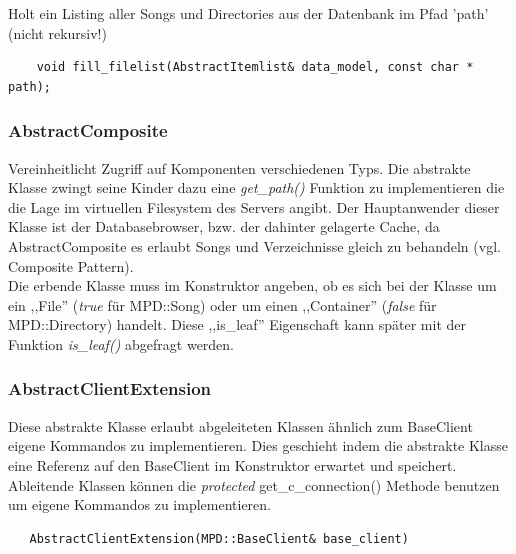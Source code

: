 Holt ein Listing aller Songs und Directories aus der Datenbank im Pfad 'path' (nicht rekursiv!)              
\begin{verbatim}
    void fill_filelist(AbstractItemlist& data_model, const char * path);
\end{verbatim}



\subsubsection{AbstractComposite}
Vereinheitlicht Zugriff auf Komponenten verschiedenen Typs.
Die abstrakte Klasse zwingt seine Kinder dazu eine \emph{get\_path()} Funktion zu implementieren die die Lage im virtuellen Filesystem des Servers angibt.
Der Hauptanwender dieser Klasse ist der Databasebrowser, bzw. der dahinter gelagerte Cache, da AbstractComposite es erlaubt Songs und Verzeichnisse gleich zu behandeln (vgl. Composite Pattern).
\\
Die erbende Klasse muss im Konstruktor angeben, ob es sich bei der Klasse um ein ,,File'' (\emph{true} für MPD::Song) oder um einen ,,Container'' (\emph{false} für MPD::Directory) handelt.
Diese ,,is\_leaf'' Eigenschaft kann später mit der Funktion \emph{is\_leaf()} abgefragt werden.



\subsubsection{AbstractClientExtension}


Diese abstrakte Klasse erlaubt abgeleiteten Klassen ähnlich zum BaseClient eigene Kommandos zu implementieren.
Dies geschieht indem die abstrakte Klasse eine Referenz auf den BaseClient im Konstruktor erwartet und speichert.
Ableitende Klassen können die \textit{protected} get\_c\_connection() Methode benutzen um eigene Kommandos zu implementieren.

\begin{verbatim}
   AbstractClientExtension(MPD::BaseClient& base_client)
\end{verbatim}


